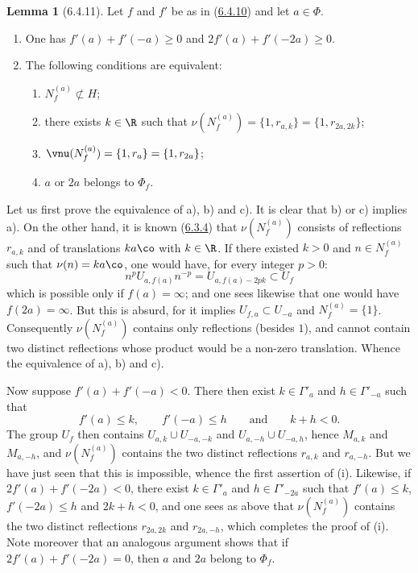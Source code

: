 \documentclass[12pt,a4paper,oneside,english]{smfart}
\makeatletter
\newcommand{\btanchor}[1]{\leavevmode\Hy@raisedlink{\hypertarget{bt:#1}{}}}
\newcommand{\btpageanchor}[1]{\Hy@raisedlink{\hypertarget{p:#1}{}}}
\newcommand{\btref}[1]{\hyperlink{bt:#1}{#1}}
\newcommand{\btpage}[1]{\marginnote{p.~#1}\btpageanchor{#1}}
\newcommand{\pmark}[1]{\btpage{#1}}
\theoremstyle{definition}
\theoremstyle{bt}
\newtheorem{lem}{Lemma}
\makeatother
\begin{document}
\begin{lem}[6.4.11]\btanchor{6.4.11}
Let $f$ and $f'$ be as in (\btref{6.4.10}) and let $a\in\Phi$.
\begin{enumerate}[label=(\roman*),leftmargin=2.2em]
\item One has $f'(a)+f'(-a)\geq0$ and $2f'(a)+f'(-2a)\geq0$.
\item The following conditions are equivalent:
\begin{enumerate}[label=\alph*),leftmargin=2.2em]
\item $N_f^{(a)}\not\subset H$;
\item there exists $k\in\R$ such that
      $\nu(N_f^{(a)})=\{1,r_{a,k}\}=\{1,r_{2a,2k}\}$;
\item $\vnu(N_f^{(a)})=\{1,r_a\}=\{1,r_{2a}\}$;
\item $a$ or $2a$ belongs to $\Phi_f$.
\end{enumerate}
\end{enumerate}
\end{lem}

Let us first prove the equivalence of a), b) and c). It is clear that b) or
c) implies a). On the other hand, it is known (\btref{6.3.4}) that
$\nu(N_f^{(a)})$ consists of reflections $r_{a,k}$ and of translations
$ka\co$ with $k\in\R$. If there existed $k>0$ and $n\in N_f^{(a)}$ such
that $\nu(n)=ka\co$, one would have, for every integer $p>0$:
\[
  n^{p}U_{a,f(a)}n^{-p}=U_{a,f(a)-2pk}\subset U_f
\]
which is possible only if $f(a)=\infty$; and one sees likewise that one
would have $f(2a)=\infty$. But this is absurd, for it implies
$U_{f,a}\subset U_{-a}$ and $N_f^{(a)}=\{1\}$. Consequently
$\nu(N_f^{(a)})$ contains only reflections (besides $1$), and cannot
contain two distinct reflections whose product would be a non-zero
translation. Whence the equivalence of a), b) and c).

Now suppose $f'(a)+f'(-a)<0$. There then exist $k\in\Gamma'_a$ and
$h\in\Gamma'_{-a}$ such that
\[
  f'(a)\leq k,\qquad f'(-a)\leq h\qquad\text{and}\qquad k+h<0.
\]
\pmark{138}
The group $U_f$ then contains $U_{a,k}\cup U_{-a,-k}$ and
$U_{a,-h}\cup U_{-a,h}$, hence $M_{a,k}$ and $M_{a,-h}$, and
$\nu(N_f^{(a)})$ contains the two distinct reflections $r_{a,k}$ and
$r_{a,-h}$. But we have just seen that this is impossible, whence the first
assertion of (i). Likewise, if $2f'(a)+f'(-2a)<0$, there exist
$k\in\Gamma'_a$ and $h\in\Gamma'_{-2a}$ such that $f'(a)\leq k$,
$f'(-2a)\leq h$ and $2k+h<0$, and one sees as above that
$\nu(N_f^{(a)})$ contains the two distinct reflections $r_{2a,2k}$ and
$r_{2a,-h}$, which completes the proof of (i). Note moreover that an
analogous argument shows that if $2f'(a)+f'(-2a)=0$, then $a$ and $2a$
belong to $\Phi_f$.
\end{document}
